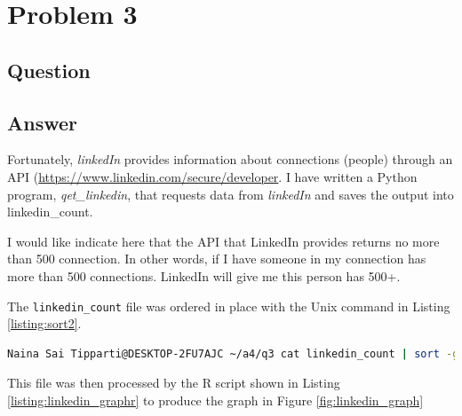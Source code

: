 \section{Problem 3}

\subsection{Question}
\vspace*{10pt}


\subsection{Answer}
Fortunately, {\it linkedIn} provides information about connections (people) through an API (\url{https://www.linkedin.com/secure/developer}. I have written a Python program,
{\it qet\_linkedin}, that requests data from {\it linkedIn} and saves the output into linkedin\_count.
\vspace{3mm}

\clearpage
\vspace{2mm}
I would like indicate here that the API that LinkedIn provides returns no more than 500 connection. In other words, if I have someone in my connection has more than 500 connections. LinkedIn will give me this person has 500+.

The {\tt linkedin\_count} file was ordered in place with the Unix command in Listing \ref{listing:sort2}. 
\vspace{2mm}
\begin{lstlisting}[language=Bash,caption={Sort command},label=listing:sort2]
Naina Sai Tipparti@DESKTOP-2FU7AJC ~/a4/q3 cat linkedin_count | sort -g -o linkedin_count
\end{lstlisting}
\vspace{2mm}
This file was then processed by the R script shown in Listing \ref{listing:linkedin_graphr} to produce the graph in Figure \ref{fig:linkedin_graph}

